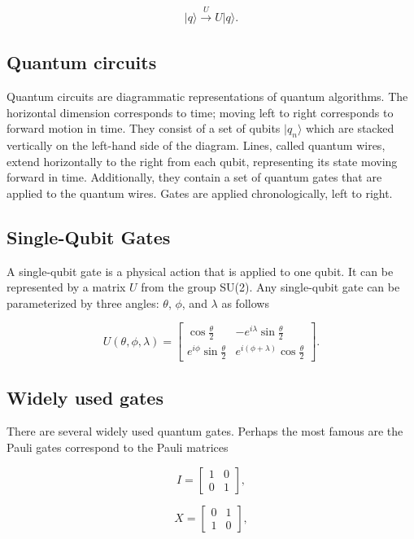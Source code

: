\documentclass[%
oneside,                 %
final,                   %
10pt]{article}
\begin{document}
\begin{align}
\vert q \rangle \overset{U}{\to}U\vert q \rangle 
.\end{align}

\subsection{Quantum circuits}

Quantum circuits are diagrammatic representations of quantum
algorithms. The horizontal dimension corresponds to time; moving left
to right corresponds to forward motion in time. They consist of a set
of qubits $\vert q_n\rangle$ which are stacked vertically on the left-hand
side of the diagram. Lines, called quantum wires, extend horizontally
to the right from each qubit, representing its state moving forward in
time. Additionally, they contain a set of quantum gates that are
applied to the quantum wires. Gates are applied chronologically, left
to right.

\subsection{Single-Qubit Gates}

A single-qubit gate is a physical action that is applied to one
qubit. It can be represented by a matrix $U$ from the group SU(2). Any
single-qubit gate can be parameterized by three angles: $\theta$,
$\phi$, and $\lambda$ as follows

\[
U(\theta,\phi,\lambda)=\begin{bmatrix}
\cos\frac{\theta}{2} & -e^{i\lambda}\sin\frac{\theta}{2}
\\
e^{i\phi}\sin\frac{\theta}{2} & e^{i(\phi+\lambda)}\cos\frac{\theta}{2}
\end{bmatrix}.
\]

\subsection{Widely used gates}

There are several widely used quantum gates. Perhaps the most famous are 
the Pauli gates correspond to the Pauli matrices

\[
I=\begin{bmatrix} 1 & 0 \\ 0 & 1 \end{bmatrix},
\]

\[
X =\begin{bmatrix} 0 & 1 \\ 1 & 0\end{bmatrix},
\]
\end{document}
